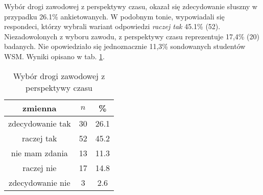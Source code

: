 


Wybór drogi zawodowej z perspektywy czasu, okazał się  zdecydowanie słuszny w przypadku 26.1\% ankietowanych. W podobnym tonie, wypowiadali się respondeci, którzy wybrali wariant odpowiedzi \textit{raczej tak} 45.1\% (52). Niezadowolonych z wyboru zawodu, z perspektywy czasu reprezentuje 17,4\% (20) badanych. Nie opowiedziało się jednoznacznie 11,3\% sondowanych studentów WSM. Wyniki opisano w tab. \ref{tab:Q36}.
\begin{table}[H]
\caption{Wybór drogi zawodowej z perspektywy czasu}
\centering
\begin{tabular}{ | c | c | c |}
\hline
zmienna & $n$ & \% \\
\hline
zdecydowanie tak  &  30  & 26.1\\
\hline
raczej tak  &  52  & 45.2 \\
\hline
nie mam zdania  &  13  & 11.3 \\
\hline
raczej nie  &  17  & 14.8 \\
\hline
zdecydowanie nie  &  3  & 2.6\\
\hline
\end{tabular}
\label{tab:Q36}
\end{table}
